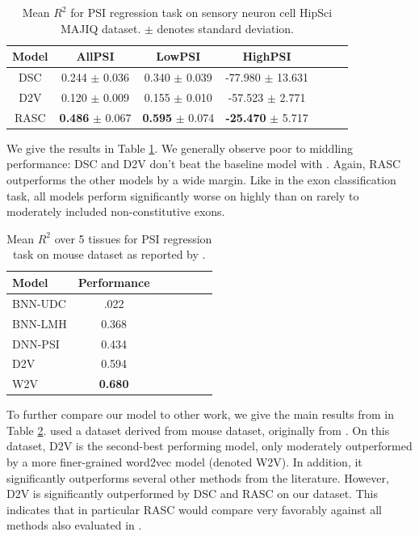 \begin{table}
	\centering
	\begin{tabular}{ c c c c c c c} 
		\hline
		Model & AllPSI &  LowPSI &  HighPSI \\
		\hline
		DSC	&	0.244   $\pm$	0.036	&	0.340	$\pm$	0.039	&	-77.980	$\pm$	13.631\\
		D2V	&	0.120	$\pm$	0.009	&	0.155	$\pm$	0.010	&	-57.523	$\pm$	2.771\\
		RASC	&	\textbf{0.486}	$\pm$	0.067	&	\textbf{0.595}	$\pm$	0.074	&	\textbf{-25.470}	$\pm$	5.717\\
		\hline
	\end{tabular}
	\caption{Mean $R^2$ for PSI regression task on sensory neuron cell HipSci MAJIQ dataset.  $\pm$ denotes standard deviation. 
	}
	\label{table:psi_regression}
\end{table}


We give the results in Table \ref{table:psi_regression}. We generally observe poor to middling performance: DSC and D2V don't beat the baseline model with . Again, RASC outperforms the other models by a wide margin. 
Like in the exon classification task, all models perform significantly worse on highly than on rarely to moderately included non-constitutive exons. 

\begin{table}
	\centering
	\begin{tabular}{ l c c c c c c} 
		\hline
		Model & Performance \\
		\hline
		BNN-UDC \cite{jha} & .022\\
		BNN-LMH \cite{jha}& 0.368\\
		DNN-PSI \cite{jha} & 0.434\\
		D2V \cite{d2vsplicing} & 0.594\\
		W2V \cite{d2vsplicing} & \textbf{0.680}\\
		\hline
	\end{tabular}
	\caption{Mean $R^2$ over 5 tissues for PSI regression task on mouse dataset as reported by \cite{d2vsplicing}. 
	}
	\label{table:ieee_regression}
\end{table}

To further compare our model to other work, we give the main results from \cite{d2vsplicing} in Table \ref{table:ieee_regression}. \cite{d2vsplicing} used a dataset derived from mouse dataset, originally from \cite{jha}. On this dataset, D2V is the second-best performing model, only moderately outperformed by a more finer-grained word2vec model (denoted W2V). In addition, it significantly outperforms several other methods from the literature. However, D2V is significantly outperformed by DSC and RASC on our dataset. This indicates that in particular RASC would compare very favorably against all methods also evaluated in \cite{d2vsplicing}. 













